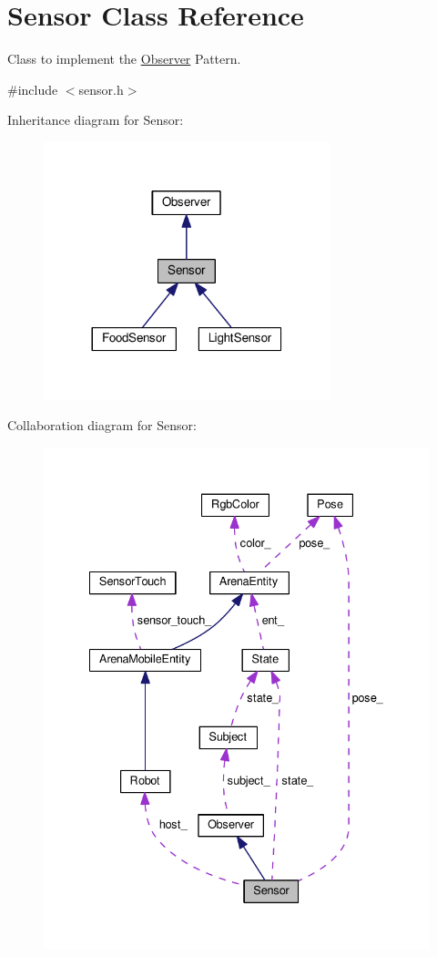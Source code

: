 \hypertarget{classSensor}{}\section{Sensor Class Reference}
\label{classSensor}


Class to implement the \hyperlink{classObserver}{Observer} Pattern.  




{\ttfamily \#include $<$sensor.\+h$>$}



Inheritance diagram for Sensor\+:\nopagebreak
\begin{figure}[H]
\begin{center}
\leavevmode
\includegraphics[width=236pt]{classSensor__inherit__graph}
\end{center}
\end{figure}


Collaboration diagram for Sensor\+:\nopagebreak
\begin{figure}[H]
\begin{center}
\leavevmode
\includegraphics[width=334pt]{classSensor__coll__graph}
\end{center}
\end{figure}
